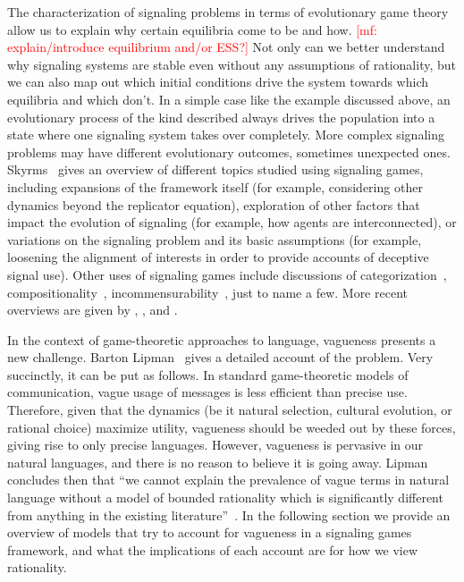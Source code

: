 \documentclass[a4paper]{article}
\newcommand{\mf}[1]{\textcolor{Red}{[mf: #1]}}
\begin{document}
The characterization of signaling problems in terms of evolutionary game theory allow us to explain why certain equilibria come to be and how. \mf{explain/introduce equilibrium and/or ESS?}
Not only can we better understand why signaling systems are stable even without any assumptions of rationality, but we can also map out which initial conditions drive the system towards which equilibria and which don't.
In a simple case like the example discussed above, an evolutionary process of the kind described always drives the population into a state where one signaling system takes over completely. %
More complex signaling problems may have different evolutionary outcomes, sometimes unexpected ones.
Skyrms~\parencite*{skyrms_signals_2010} gives an overview of different topics studied using signaling games, including expansions of the framework itself (for example, considering other dynamics beyond the replicator equation), exploration of other factors that impact the evolution of signaling (for example, how agents are interconnected), or variations on the signaling problem and its basic assumptions (for example, loosening the alignment of interests in order to provide accounts of deceptive signal use).
Other uses of signaling games include discussions of categorization~\parencite[\emph{e.g.}][]{jager_language_2007}, compositionality~\parencite[\emph{e.g.}][]{barrett_evolution_2009}, incommensurability~\parencite[\emph{e.g.}][]{barrett_faithful_2010}, just to name a few.
More recent overviews are given by \textcites{huttegger_how_2014}, \textcite{huttegger_dynamics_2014}, and \citet{FrankeWagner2014:Game-Theory-and}.

In the context of game-theoretic approaches to language, vagueness presents a new challenge.
Barton Lipman~\parencite*{lipman_why_2009} gives a detailed account of the problem.
Very succinctly, it can be put as follows.
In standard game-theoretic models of communication, vague usage of messages is less efficient than precise use.
Therefore, given that the dynamics (be it natural selection, cultural evolution, or rational choice) maximize utility, vagueness should be weeded out by these forces, giving rise to only precise languages.
However, vagueness is pervasive in our natural languages, and there is no reason to believe it is going away.
Lipman concludes then that ``we cannot explain the prevalence of vague terms in natural language without a model of bounded rationality which is significantly different from anything in the existing literature''~\parencite*[1]{lipman_why_2009}.
In the following section we provide an overview of models that try to account for vagueness in a signaling games framework, and what the implications of each account are for how we view rationality.
\end{document}
